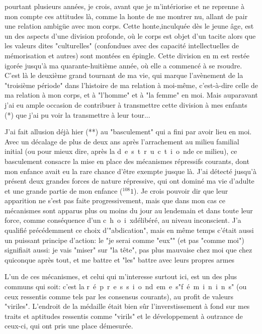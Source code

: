 

pourtant plusieurs années, je crois, avant que je m'intériorise et ne reprenne à mon compte ces attitudes là, comme la honte de me montrer nu, allant de pair  une relation ambigüe avec mon corps. Cette honte,inculquée dès le jeune âge, est un des aspects d'une division profonde, où le corps est objet d'un tacite  alors que les valeurs dites "culturelles" (confondues avec des capacité intellectuelles de mémorisation et autres) sont montées en épingle. Cette division en m est restée igorée jusqu'à ma quarante-huitième année, où elle a commencé à se rsoudre. C'est là le deuxième grand tournant de ma vie, qui marque l'avènement de la "troisième période" dans l'histoire de ma relation à moi-même, c'est-à-dire  celle de ma relation à mon corps, et à "l'homme" et à "la femme" en moi. Mais auparavant j'ai eu ample occasion de contribuer à transmettre cette division à mes enfants (*)\handwritten{,} que j'ai pu voir la transmettre à leur tour...

J'ai fait allusion déjà hier (**) au "basculement" qui a fini par avoir lieu en moi. Avec un décalage de plus de deux ans après l'arrachement au milieu familial initial (ou pour mieux dire, après la \quad\mbox{d e s t r u c t i o n}\quad de ce milieu), ce basculement consacre la mise en place des mécanismes répressifs courants, dont mon enfance avait eu la rare chance d'être exempte jusque là. J'ai détecté jusqu'à présent deux grandes forces de nature répressive, qui ont dominé ma vie d'adulte et une grande partie de mon enfance ($^{108}1$). Je crois pouvoir dir que leur apparition ne s'est pas faite progressivement, mais que dans mon cas ce mécanismes sont apparus plus ou moins du jour au lendemain et dans toute leur force, comme conséquence d'un \quad\mbox{c h o i x}\quad délibéré, au niveau inconscient. J'a qualifié précédemment ce choix d'"abdication", mais en même temps c'était aussi un puissant principe d'action: le "je serai comme "eux"" (et pas "comme moi") signifiait aussi: je vais "miser" sur "la tête", pas plus mauvaise chez moi que chez quiconque après tout, et me battre et "les" battre avec leurs propres armes

L'un de ces mécanismes, et celui qui m'interesse surtout ici, est un des plus communs qui soit: c'est la \quad\mbox{r é p r e s s i o n}\quad\mbox{d e}\quad\mbox{m e s}\quad\mbox{}\quad "\mbox{f é m i n i n s}" (ou ceux ressentis comme tels par les consensus courants), au profit de valeurs "viriles". L'endroit de la médaille était bien sûr l'inverstissement à fond sur mes traits et aptitudes ressentis comme "virils" et le développement à outrance de ceux-ci, qui ont pris une place démesurée.

